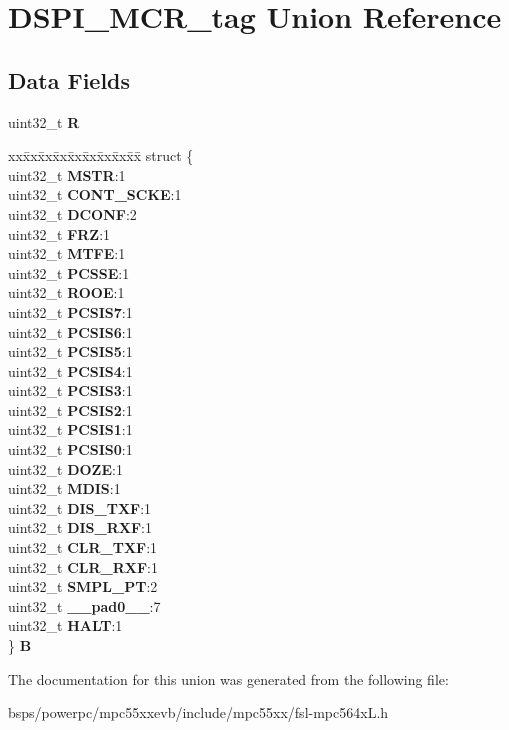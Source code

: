 \hypertarget{unionDSPI__MCR__tag}{}\section{D\+S\+P\+I\+\_\+\+M\+C\+R\+\_\+tag Union Reference}
\label{unionDSPI__MCR__tag}
\subsection*{Data Fields}
\begin{DoxyCompactItemize}
\item 
\mbox{\label{unionDSPI__MCR__tag_ae5bb03dc9f4cf6e55fef76a6af550969}} 
uint32\+\_\+t {\bfseries R}
\item 
\mbox{\label{unionDSPI__MCR__tag_ab623435db5cd0de7e45bf92aac4eaadf}} 
\begin{tabbing}
xx\=xx\=xx\=xx\=xx\=xx\=xx\=xx\=xx\=\kill
struct \{\\
\>uint32\_t {\bfseries MSTR}:1\\
\>uint32\_t {\bfseries CONT\_SCKE}:1\\
\>uint32\_t {\bfseries DCONF}:2\\
\>uint32\_t {\bfseries FRZ}:1\\
\>uint32\_t {\bfseries MTFE}:1\\
\>uint32\_t {\bfseries PCSSE}:1\\
\>uint32\_t {\bfseries ROOE}:1\\
\>uint32\_t {\bfseries PCSIS7}:1\\
\>uint32\_t {\bfseries PCSIS6}:1\\
\>uint32\_t {\bfseries PCSIS5}:1\\
\>uint32\_t {\bfseries PCSIS4}:1\\
\>uint32\_t {\bfseries PCSIS3}:1\\
\>uint32\_t {\bfseries PCSIS2}:1\\
\>uint32\_t {\bfseries PCSIS1}:1\\
\>uint32\_t {\bfseries PCSIS0}:1\\
\>uint32\_t {\bfseries DOZE}:1\\
\>uint32\_t {\bfseries MDIS}:1\\
\>uint32\_t {\bfseries DIS\_TXF}:1\\
\>uint32\_t {\bfseries DIS\_RXF}:1\\
\>uint32\_t {\bfseries CLR\_TXF}:1\\
\>uint32\_t {\bfseries CLR\_RXF}:1\\
\>uint32\_t {\bfseries SMPL\_PT}:2\\
\>uint32\_t {\bfseries \_\_pad0\_\_}:7\\
\>uint32\_t {\bfseries HALT}:1\\
\} {\bfseries B}\\

\end{tabbing}\end{DoxyCompactItemize}


The documentation for this union was generated from the following file\+:\begin{DoxyCompactItemize}
\item 
bsps/powerpc/mpc55xxevb/include/mpc55xx/fsl-\/mpc564x\+L.\+h\end{DoxyCompactItemize}

